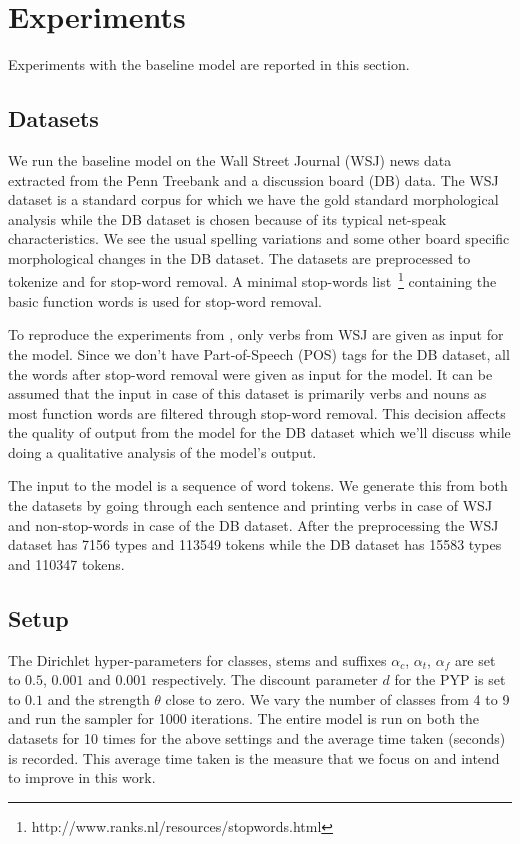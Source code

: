 \documentclass{article}
\begin{document}
\section{Experiments}
\label{sec:experiments}

Experiments with the baseline model are reported in this section.

\subsection{Datasets}

We run the baseline model on the Wall Street Journal (WSJ) news data extracted from the Penn Treebank
and a discussion board (DB) data. The WSJ dataset is a standard corpus 
for which we have the gold standard morphological analysis while the DB dataset 
is chosen because of its typical net-speak characteristics. We see 
the usual spelling variations and some other board specific morphological
 changes in the DB dataset. The datasets are preprocessed to tokenize 
and for stop-word removal. A minimal stop-words 
list~\footnote{http://www.ranks.nl/resources/stopwords.html} containing 
the basic function words is used for stop-word removal.

To reproduce the experiments from \cite{goldwater2011}, only verbs from WSJ 
are given as input for the model. Since we don't have Part-of-Speech (POS)
 tags for the DB dataset, all the words after stop-word removal were 
given as input for the model. It can be assumed that the input in case of 
this dataset is primarily verbs and nouns as most function words are filtered 
through stop-word removal. This decision affects the quality of output 
from the model for the DB dataset which we'll discuss while doing a 
qualitative analysis of the model's output.

The input to the model is a sequence of word tokens. We generate this 
from both the datasets by going through each sentence and printing verbs 
in case of WSJ and non-stop-words in case of the DB dataset. After the 
preprocessing the WSJ dataset has 7156 types and 113549 tokens while the 
DB dataset has 15583 types and 110347 tokens.

\subsection{Setup}

The Dirichlet hyper-parameters for classes, stems and suffixes 
$\alpha_{c}$, $\alpha_{t}$, $\alpha_{f}$ are set to 
$0.5$, $0.001$ and $0.001$ respectively. The discount parameter $d$ for the PYP is set 
to $0.1$ and the strength $\theta$ close to zero.
We vary the number of classes from 4 to 9 and run the sampler for 1000 
iterations. The entire model is run on both the datasets for 10 times 
for the above settings and the average time taken (seconds) is recorded.
This average time taken is the measure that we focus on and intend to 
improve in this work.
\end{document}
